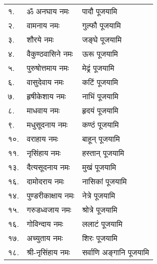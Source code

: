 \begin{center}
\begin{longtable}{ll@{— }l}
१.&	ॐ अनघाय नमः & पादौ पूजयामि	\\
२.&	वामनाय नमः & गुल्फौ पूजयामि\\
३.&	शौरये   नमः & जङ्घे पूजयामि	\\
४.&	वैकुण्ठवासिने नमः & ऊरू पूजयामि	\\
५.&	पुरुषोत्तमाय   नमः & मेढ्रं पूजयामि		\\
६.&	वासुदेवाय   नमः & कटिं पूजयामि	\\
७.&	हृषीकेशाय   नमः & नाभिं पूजयामि\\
८.&   माधवाय नमः & हृदयं पूजयामि\\
९.& मधुसूदनाय   नमः & कण्ठं पूजयामि\\
१०.&	वराहाय   नमः & बाहून् पूजयामि	\\
११.& नृसिंहाय   नमः & हस्तान् पूजयामि	\\
१३.& दैत्यसूदनाय   नमः & मुखं पूजयामि	\\
१६.& दामोदराय   नमः & नासिकां पूजयामि	\\
१४.&	 पुण्डरीकाक्षाय   नमः & नेत्रे पूजयामि\\
१५.& गरुडध्वजाय   नमः & श्रोत्रे पूजयामि	\\
१६.& गोविन्दाय   नमः & ललाटं पूजयामि	\\
१७.& अच्युताय   नमः & शिरः पूजयामि\\
१८.& श्री-नृसिंहाय   नमः &   सर्वाणि अङ्गानि पूजयामि	\\
\end{longtable}


\end{center}
